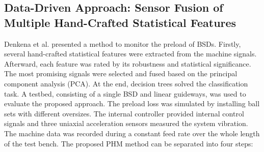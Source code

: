 \subsection{Data-Driven Approach: Sensor Fusion of Multiple Hand-Crafted Statistical Features}

Denkena et al. \cite{Denkena2021} presented a method to monitor the preload of BSDs. Firstly, several hand-crafted statistical features were extracted from the machine signals. Afterward, each feature was rated by its robustness and statistical significance. The most promising signals were selected and fused based on the principal component analysis (PCA). At the end, decision trees solved the classification task. A testbed, consisting of a single BSD and linear guideways, was used to evaluate the proposed approach. The preload loss was simulated by installing ball sets with different oversizes. The internal controller provided internal control signals and three uniaxial acceleration sensors measured the system vibration. The machine data was recorded during a constant feed rate over the whole length of the test bench. The proposed PHM method can be separated into four steps:

